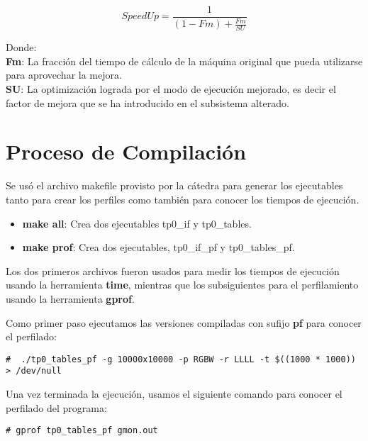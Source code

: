 \documentclass[a4paper, 10pt, twoside, notitlepage]{article}
\begin{document}
\begin{equation}
 SpeedUp =\frac{1}{(1-Fm) + \frac{Fm}{SU}}
\end{equation}

Donde:\\

\textbf{Fm}: La fracción del tiempo de cálculo de la máquina original que pueda utilizarse para aprovechar la mejora.\\

\textbf{SU}: La optimización lograda por el modo de ejecución mejorado, es decir el factor de mejora que se ha introducido en el subsistema alterado.


\newpage

\section{Proceso de Compilación}

Se usó el archivo makefile provisto por la cátedra para generar los ejecutables tanto para crear los perfiles como también para conocer los tiempos de ejecución.\\

\begin{itemize} 
\item[] \textbf{make all}: Crea dos ejecutables tp0\_if y tp0\_tables.
 \item[] \textbf{make prof}: Crea dos ejecutables, tp0\_if\_pf y tp0\_tables\_pf.
\end{itemize}

Los dos primeros archivos fueron usados para medir los tiempos de ejecución usando la herramienta \textbf{time}, mientras que los subsiguientes para el perfilamiento usando la herramienta \textbf{gprof}.

Como primer paso ejecutamos las versiones compiladas con sufijo \textbf{pf} para conocer el perfilado:
\scriptsize
\begin{verbatim}
#  ./tp0_tables_pf -g 10000x10000 -p RGBW -r LLLL -t $((1000 * 1000)) > /dev/null
\end{verbatim}
\normalsize

Una vez terminada la ejecución, usamos el siguiente comando para conocer el perfilado del programa:

\scriptsize
\begin{verbatim}
# gprof tp0_tables_pf gmon.out
\end{verbatim}
\normalsize
\end{document}
